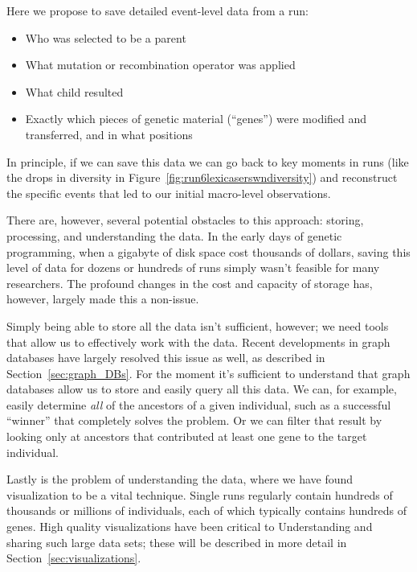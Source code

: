Here we propose to save detailed event-level data from a run:
\begin{itemize}
	\item Who was selected to be a parent
	\item What mutation or recombination operator was applied
	\item What child resulted
	\item Exactly which pieces of genetic material (``genes'') were
	modified and transferred, and in what positions
\end{itemize}
In principle, if we can save this data we can go back to key moments
in runs (like the drops in diversity in 
Figure~\ref{fig:run6lexicaserswndiversity}) and reconstruct the specific
events that led to our initial macro-level observations.

There are, however, several potential obstacles to this approach: storing, 
processing, and understanding the data. In the early days of genetic programming, when a gigabyte
of disk space cost thousands of dollars, saving this level of data for dozens 
or hundreds of runs simply wasn't feasible for many researchers. The
profound changes in the cost and capacity of storage has, however, 
largely made this a non-issue.


Simply being able to store all the data isn't sufficient, however; we need
tools that allow us to effectively work with the data. Recent developments
in graph databases have largely resolved this issue as well, as described
in Section~\ref{sec:graph_DBs}. For the moment it's sufficient to understand
that graph databases allow us to store and easily query all this data. We can,
for example, easily determine \emph{all} of the ancestors of a given
individual, such as a successful ``winner'' that completely solves the problem.
Or we can filter that result by looking only at ancestors that contributed
at least one gene to the target individual.

Lastly is the problem of understanding the data, where we have found
visualization to be a vital technique. Single runs regularly contain hundreds
of thousands or millions of individuals, each of which typically contains
hundreds of genes. High quality visualizations have been critical to 
Understanding and sharing such large data sets; these will be described 
in more detail in Section~\ref{sec:visualizations}.

